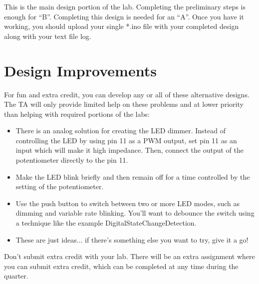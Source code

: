 \documentclass[12pt]{article}
\begin{document}
This is the main design portion of the lab.  Completing the
preliminary steps is enough for ``B''.  Completing this design is
needed for an ``A''.  Once you have it working, you should upload your
single *.ino file with your completed design along with your text file
log.

\section{Design Improvements}

For fun and extra credit, you can develop any or all of these
alternative designs.  The TA will only provide limited help on these
problems and at lower priority than helping with required portions of
the labs:
\begin{itemize}
\item There is an analog solution for creating the LED dimmer.
  Instead of controlling the LED by using pin 11 as a PWM output, set
  pin 11 as an input which will make it high impedance.  Then, connect
  the output of the potentiometer directly to the pin 11.
\item Make the LED blink briefly and then remain off for a time
  controlled by the setting of the potentiometer.
\item Use the push button to switch between two or more LED modes,
  such as dimming and variable rate blinking.  You'll want to debounce
  the switch using a technique like the example
  DigitalStateChangeDetection.
\item These are just ideas... if there's something else you want to try, give it a go!
\end{itemize}
Don't submit extra credit with your lab.  There will be an extra
assignment where you can submit extra credit, which can be completed
at any time during the quarter.

 
\end{document}
